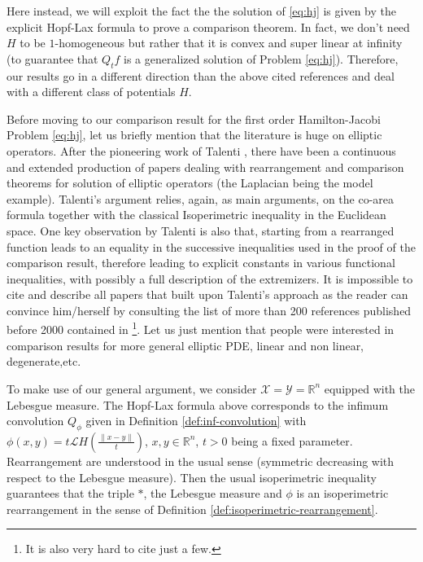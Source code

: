 \documentclass[11pt]{article}
\newcommand{\1}{[1]}
\begin{document}
Here instead, we will exploit the fact the the solution of \eqref{eq:hj} is given by the explicit Hopf-Lax formula to prove a comparison theorem.
In fact, we don't need $H$ to be $1$-homogeneous but rather that it is convex and super linear at infinity
(to guarantee that $Q_tf$ is a generalized solution of Problem \eqref{eq:hj}). Therefore, our results go in a different direction than the above cited references and deal with a different class of potentials $H$.

Before moving to our comparison result for the first order  Hamilton-Jacobi Problem \eqref{eq:hj}, let us briefly mention that the literature is huge on elliptic operators. After the pioneering work of Talenti \cite{talenti}, there have been a continuous and extended production of papers dealing with rearrangement and comparison theorems for solution of elliptic operators (the Laplacian being the model example). Talenti's argument relies, again, as main arguments, on the co-area formula together with the classical Isoperimetric inequality in the Euclidean space. One key observation by Talenti is also that, starting from a rearranged function leads to an equality in the successive inequalities used in the proof of the comparison result, therefore leading to explicit constants in various functional inequalities, with possibly a full description of the extremizers. It is impossible to cite and describe all papers that built upon Talenti's approach as the reader can convince him/herself by consulting the list of more than 200 references published before 2000 contained in \cite{trombetti}\footnote{It is also very hard to cite just a few.}. Let us just mention that people were interested in comparison results for more general elliptic PDE, linear and non linear, degenerate,etc.


\medskip


To make use of our general argument, we consider 
$\mathcal{X}=\mathcal{Y}=\mathbb{R}^n$ equipped with the Lebesgue measure. The Hopf-Lax formula above corresponds to the infimum convolution
$Q_\phi$ given in Definition \ref{def:inf-convolution}
with $\phi (x,y)= t  \mathcal{L}H \left( \frac{\|x-y\|}{t} \right)$, $x,y \in \mathbb{R}^n$, $t>0$ being a fixed parameter. Rearrangement are understood in the usual sense (symmetric decreasing with respect to the Lebesgue measure). Then the usual isoperimetric inequality guarantees that the triple $*$, the Lebesgue measure and $\phi$ is an isoperimetric rearrangement in the sense of Definition  \ref{def:isoperimetric-rearrangement}.
\end{document}
